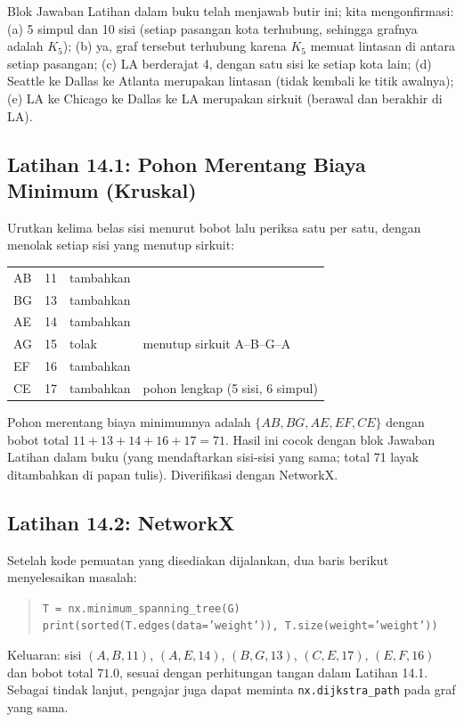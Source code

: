 Blok Jawaban Latihan dalam buku telah menjawab butir ini; kita mengonfirmasi: (a) 5 simpul dan 10 sisi (setiap pasangan kota terhubung, sehingga grafnya adalah $K_5$); (b) ya, graf tersebut terhubung karena $K_5$ memuat lintasan di antara setiap pasangan; (c) LA berderajat 4, dengan satu sisi ke setiap kota lain; (d) Seattle ke Dallas ke Atlanta merupakan lintasan (tidak kembali ke titik awalnya); (e) LA ke Chicago ke Dallas ke LA merupakan sirkuit (berawal dan berakhir di LA).

\subsection*{Latihan 14.1: Pohon Merentang Biaya Minimum (Kruskal)}

Urutkan kelima belas sisi menurut bobot lalu periksa satu per satu, dengan menolak setiap sisi yang menutup sirkuit:
\begin{center}
\begin{tabular}{llll}
AB & 11 & tambahkan & \\
BG & 13 & tambahkan & \\
AE & 14 & tambahkan & \\
AG & 15 & tolak & menutup sirkuit A--B--G--A \\
EF & 16 & tambahkan & \\
CE & 17 & tambahkan & pohon lengkap (5 sisi, 6 simpul) \\
\end{tabular}
\end{center}
Pohon merentang biaya minimumnya adalah $\{AB, BG, AE, EF, CE\}$ dengan bobot total $11 + 13 + 14 + 16 + 17 = 71$. Hasil ini cocok dengan blok Jawaban Latihan dalam buku (yang mendaftarkan sisi-sisi yang sama; total 71 layak ditambahkan di papan tulis). Diverifikasi dengan NetworkX.

\subsection*{Latihan 14.2: NetworkX}

Setelah kode pemuatan yang disediakan dijalankan, dua baris berikut menyelesaikan masalah:
\begin{quote}
\texttt{T = nx.minimum\_spanning\_tree(G)} \\
\texttt{print(sorted(T.edges(data='weight')), T.size(weight='weight'))}
\end{quote}
Keluaran: sisi $(A,B,11)$, $(A,E,14)$, $(B,G,13)$, $(C,E,17)$, $(E,F,16)$ dan bobot total $71.0$, sesuai dengan perhitungan tangan dalam Latihan 14.1. Sebagai tindak lanjut, pengajar juga dapat meminta \texttt{nx.dijkstra\_path} pada graf yang sama.

